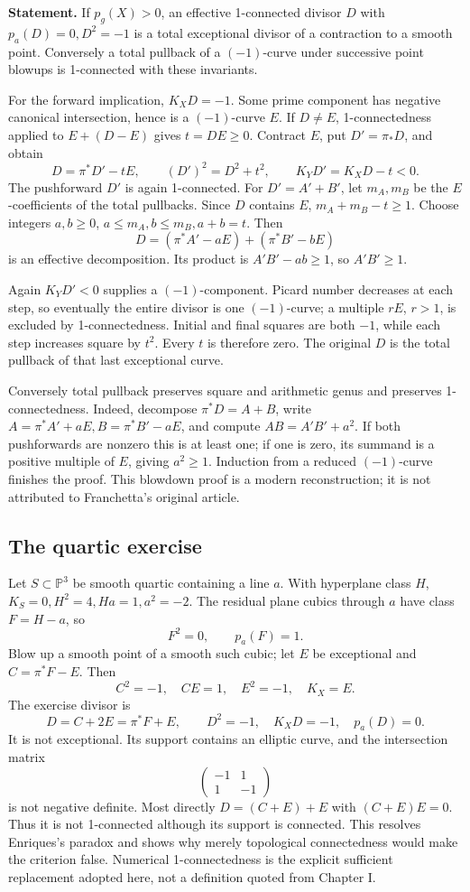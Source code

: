 \textbf{Statement.} If \(p_g(X)>0\), an effective 1-connected divisor \(D\) with \(p_a(D)=0,D^2=-1\) is a total exceptional divisor of a contraction to a smooth point. Conversely a total pullback of a \((-1)\)-curve under successive point blowups is 1-connected with these invariants.

For the forward implication, \(K_X D=-1\). Some prime component has negative canonical intersection, hence is a \((-1)\)-curve \(E\). If \(D\ne E\), 1-connectedness applied to \(E+(D-E)\) gives \(t=DE\ge0\). Contract \(E\), put \(D'=\pi_*D\), and obtain \[
D=\pi^*D'-tE,\qquad (D')^2=D^2+t^2,\qquad
K_YD'=K_XD-t<0.
\] The pushforward \(D'\) is again 1-connected. For \(D'=A'+B'\), let \(m_A,m_B\) be the \(E\)-coefficients of the total pullbacks. Since \(D\) contains \(E\), \(m_A+m_B-t\ge1\). Choose integers \(a,b\ge0\), \(a\le m_A,b\le m_B,a+b=t\). Then \[
D=(\pi^*A'-aE)+(\pi^*B'-bE)
\] is an effective decomposition. Its product is \(A'B'-ab\ge1\), so \(A'B'\ge1\).

Again \(K_YD'<0\) supplies a \((-1)\)-component. Picard number decreases at each step, so eventually the entire divisor is one \((-1)\)-curve; a multiple \(rE\), \(r>1\), is excluded by 1-connectedness. Initial and final squares are both \(-1\), while each step increases square by \(t^2\). Every \(t\) is therefore zero. The original \(D\) is the total pullback of that last exceptional curve.

Conversely total pullback preserves square and arithmetic genus and preserves 1-connectedness. Indeed, decompose \(\pi^*D=A+B\), write \(A=\pi^*A'+aE,B=\pi^*B'-aE\), and compute \(AB=A'B'+a^2\). If both pushforwards are nonzero this is at least one; if one is zero, its summand is a positive multiple of \(E\), giving \(a^2\ge1\). Induction from a reduced \((-1)\)-curve finishes the proof. This blowdown proof is a modern reconstruction; it is not attributed to Franchetta's original article.

\subsection{The quartic exercise}

Let \(S\subset\mathbb{P}^3\) be smooth quartic containing a line \(a\). With hyperplane class \(H\), \(K_S=0,H^2=4,Ha=1,a^2=-2\). The residual plane cubics through \(a\) have class \(F=H-a\), so \[
F^2=0,\qquad p_a(F)=1.
\] Blow up a smooth point of a smooth such cubic; let \(E\) be exceptional and \(C=\pi^*F-E\). Then \[
C^2=-1,\quad CE=1,\quad E^2=-1,\quad K_X=E.
\] The exercise divisor is \[
D=C+2E=\pi^*F+E,\qquad D^2=-1,\quad K_X D=-1,\quad p_a(D)=0.
\] It is not exceptional. Its support contains an elliptic curve, and the intersection matrix \[
\begin{pmatrix}-1&1\\1&-1\end{pmatrix}
\] is not negative definite. Most directly \(D=(C+E)+E\) with \((C+E)E=0\). Thus it is not 1-connected although its support is connected. This resolves Enriques's paradox and shows why merely topological connectedness would make the criterion false. Numerical 1-connectedness is the explicit sufficient replacement adopted here, not a definition quoted from Chapter I.

